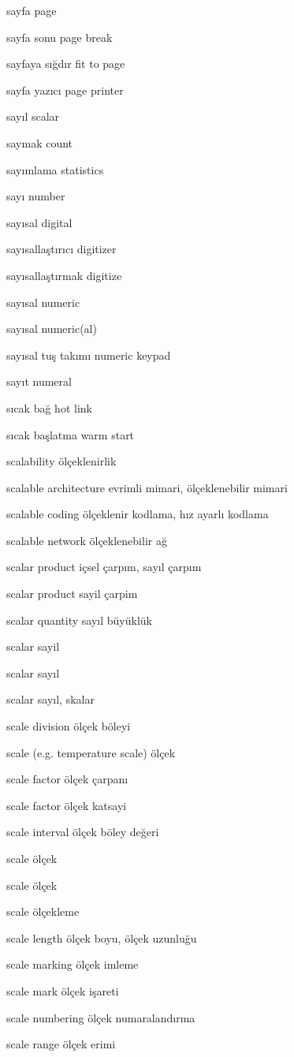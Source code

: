 \documentclass[12pt,fleqn]{article}\usepackage{../../common}
\begin{document}
sayfa page

sayfa sonu page break

sayfaya sığdır fit to page

sayfa yazıcı page printer

sayıl scalar

saymak count

sayımlama statistics

sayı number

sayısal digital

sayısallaştırıcı digitizer

sayısallaştırmak digitize

sayısal numeric

sayısal numeric(al)

sayısal tuş takımı numeric keypad

sayıt numeral

sıcak bağ hot link

sıcak başlatma warm start

scalability ölçeklenirlik

scalable architecture evrimli mimari, ölçeklenebilir mimari

scalable coding ölçeklenir kodlama, hız ayarlı kodlama

scalable network ölçeklenebilir ağ

scalar product içsel çarpım, sayıl çarpım

scalar product sayil çarpim

scalar quantity sayıl büyüklük

scalar sayil

scalar sayıl

scalar sayıl, skalar

scale division ölçek böleyi

scale (e.g. temperature scale) ölçek

scale factor ölçek çarpanı

scale factor ölçek katsayi

scale interval ölçek böley değeri

scale ölçek

scale ölçek

scale ölçekleme

scale length ölçek boyu, ölçek uzunluğu

scale marking ölçek imleme

scale mark ölçek işareti

scale numbering ölçek numaralandırma

scale range ölçek erimi
\end{document}
